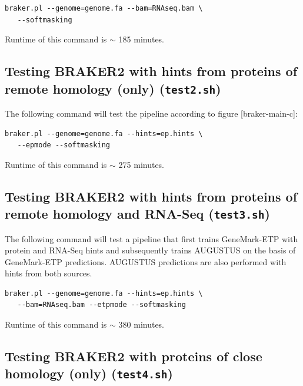 \documentclass[]{article}
\begin{document}
\begin{verbatim}
braker.pl --genome=genome.fa --bam=RNAseq.bam \
   --softmasking
\end{verbatim}

Runtime of this command is \(\sim\) 185 minutes.

\hypertarget{testing-braker2-with-hints-from-proteins-of-remote-homology-only-test2.sh}{\subsection{\texorpdfstring{Testing
BRAKER2 with hints from proteins of remote homology (only)
(\texttt{test2.sh})}{Testing BRAKER2 with hints from proteins of remote homology (only) (test2.sh)}}\label{testing-braker2-with-hints-from-proteins-of-remote-homology-only-test2.sh}}

The following command will test the pipeline according to figure
{[}braker-main-c{]}:

\begin{verbatim}
braker.pl --genome=genome.fa --hints=ep.hints \
   --epmode --softmasking
\end{verbatim}

Runtime of this command is \(\sim\) 275 minutes.

\hypertarget{testing-braker2-with-hints-from-proteins-of-remote-homology-and-rna-seq-test3.sh}{\subsection{\texorpdfstring{Testing
BRAKER2 with hints from proteins of remote homology and RNA-Seq
(\texttt{test3.sh})}{Testing BRAKER2 with hints from proteins of remote homology and RNA-Seq (test3.sh)}}\label{testing-braker2-with-hints-from-proteins-of-remote-homology-and-rna-seq-test3.sh}}

The following command will test a pipeline that first trains
GeneMark-ETP with protein and RNA-Seq hints and subsequently trains
AUGUSTUS on the basis of GeneMark-ETP predictions. AUGUSTUS predictions
are also performed with hints from both sources.

\begin{verbatim}
braker.pl --genome=genome.fa --hints=ep.hints \
   --bam=RNAseq.bam --etpmode --softmasking
\end{verbatim}

Runtime of this command is \(\sim\) 380 minutes.

\hypertarget{testing-braker2-with-proteins-of-close-homology-only-test4.sh}{\subsection{\texorpdfstring{Testing
BRAKER2 with proteins of close homology (only)
(\texttt{test4.sh})}{Testing BRAKER2 with proteins of close homology (only) (test4.sh)}}\label{testing-braker2-with-proteins-of-close-homology-only-test4.sh}}
\end{document}
